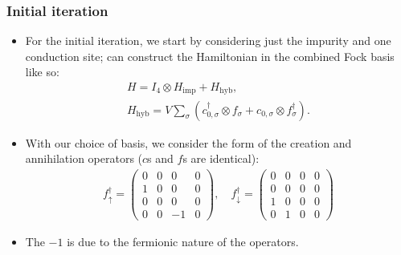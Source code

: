 \documentclass{beamer}
\begin{document}
\begin{frame}
  \frametitle{Initial iteration}

  \begin{itemize}
  \item For the initial iteration, we start by considering just the impurity and one conduction site; can construct the Hamiltonian in the combined Fock basis like so:
    \begin{gather*}
      H = I_4 \otimes H_{\mathrm{imp}} + H_{\mathrm{hyb}}, \\
      H_{\mathrm{hyb}} = V\sum_\sigma (c^\dagger_{0,\sigma} \otimes f_\sigma + c_{0,\sigma} \otimes f^\dagger_\sigma).
    \end{gather*}
  \item With our choice of basis, we consider the form of the creation and annihilation operators ($c$s and $f$s are identical):
    \begin{gather*}
      f^\dagger_\uparrow =
      \begin{pmatrix}0 & 0 & 0 & 0 \\ 1 & 0 & 0 & 0 \\ 0 & 0 & 0 & 0 \\ 0 & 0 & -1 & 0\end{pmatrix},\quad f^\dagger_\downarrow =
      \begin{pmatrix}0 & 0 & 0 & 0 \\ 0 & 0 & 0 & 0 \\ 1 & 0 & 0 & 0 \\ 0 & 1 & 0 & 0\end{pmatrix}
    \end{gather*}
  \item The $-1$ is due to the fermionic nature of the operators.
  \end{itemize}
\end{frame}
\end{document}
